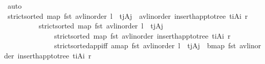 \begin{isabellebody}
\ auto\isanewline
\ \ \ \ \ \ \isamarkupfalse%
\ \isamarkupfalse%
\ {\isachardoublequoteopen}strict{\isacharunderscore}{\kern0pt}sorted\ {\isacharparenleft}{\kern0pt}map\ fst\ {\isacharparenleft}{\kern0pt}avl{\isacharunderscore}{\kern0pt}inorder\ l\ {\isacharat}{\kern0pt}\ {\isacharparenleft}{\kern0pt}t\isactrlsub j{\isacharcomma}{\kern0pt}A\isactrlsub j{\isacharparenright}{\kern0pt}\ {\isacharhash}{\kern0pt}\ avl{\isacharunderscore}{\kern0pt}inorder\ {\isacharparenleft}{\kern0pt}insert{\isacharunderscore}{\kern0pt}happ{\isacharunderscore}{\kern0pt}to{\isacharunderscore}{\kern0pt}tree\ {\isacharparenleft}{\kern0pt}t\isactrlsub i{\isacharcomma}{\kern0pt}A\isactrlsub i{\isacharparenright}{\kern0pt}\ r{\isacharparenright}{\kern0pt}{\isacharparenright}{\kern0pt}{\isacharparenright}{\kern0pt}{\isachardoublequoteclose}\isanewline
\ \ \ \ \ \ \ \ \isamarkupfalse%
\ {\isacartoucheopen}strict{\isacharunderscore}{\kern0pt}sorted\ {\isacharparenleft}{\kern0pt}map\ fst\ {\isacharparenleft}{\kern0pt}avl{\isacharunderscore}{\kern0pt}inorder\ l\ {\isacharat}{\kern0pt}\ {\isacharbrackleft}{\kern0pt}{\isacharparenleft}{\kern0pt}t\isactrlsub j{\isacharcomma}{\kern0pt}A\isactrlsub j{\isacharparenright}{\kern0pt}{\isacharbrackright}{\kern0pt}{\isacharparenright}{\kern0pt}{\isacharparenright}{\kern0pt}{\isacartoucheclose}\isanewline
\ \ \ \ \ \ \ \ \ \ \ \ \ \ {\isacartoucheopen}strict{\isacharunderscore}{\kern0pt}sorted\ {\isacharparenleft}{\kern0pt}map\ fst\ {\isacharparenleft}{\kern0pt}avl{\isacharunderscore}{\kern0pt}inorder\ {\isacharparenleft}{\kern0pt}insert{\isacharunderscore}{\kern0pt}happ{\isacharunderscore}{\kern0pt}to{\isacharunderscore}{\kern0pt}tree\ {\isacharparenleft}{\kern0pt}t\isactrlsub i{\isacharcomma}{\kern0pt}A\isactrlsub i{\isacharparenright}{\kern0pt}\ r{\isacharparenright}{\kern0pt}{\isacharparenright}{\kern0pt}{\isacharparenright}{\kern0pt}{\isacartoucheclose}\isanewline
\ \ \ \ \ \ \ \ \ \ \ \ \ \ strict{\isacharunderscore}{\kern0pt}sorted{\isacharunderscore}{\kern0pt}app{\isacharunderscore}{\kern0pt}iff{\isacharbrackleft}{\kern0pt}\ a{\isacharequal}{\kern0pt}{\isachardoublequoteopen}map\ fst\ {\isacharparenleft}{\kern0pt}avl{\isacharunderscore}{\kern0pt}inorder\ l\ {\isacharat}{\kern0pt}\ {\isacharbrackleft}{\kern0pt}{\isacharparenleft}{\kern0pt}t\isactrlsub j{\isacharcomma}{\kern0pt}A\isactrlsub j{\isacharparenright}{\kern0pt}{\isacharbrackright}{\kern0pt}{\isacharparenright}{\kern0pt}{\isachardoublequoteclose}\ \ b{\isacharequal}{\kern0pt}{\isachardoublequoteopen}map\ fst\ {\isacharparenleft}{\kern0pt}avl{\isacharunderscore}{\kern0pt}inorder\ {\isacharparenleft}{\kern0pt}insert{\isacharunderscore}{\kern0pt}happ{\isacharunderscore}{\kern0pt}to{\isacharunderscore}{\kern0pt}tree\ {\isacharparenleft}{\kern0pt}t\isactrlsub i{\isacharcomma}{\kern0pt}A\isactrlsub i{\isacharparenright}{\kern0pt}\ r{\isacharparenright}{\kern0pt}{\isacharparenright}{\kern0pt}{\isachardoublequoteclose}{\isacharbrackright}{\kern0pt}\ \isanewline

\end{isabellebody}
